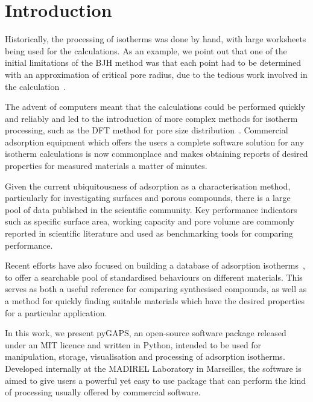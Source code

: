 
\section{Introduction}

Historically, the processing of isotherms was done by hand, with large 
worksheets being used for the calculations. As an example, we point out that one of 
the initial limitations of the BJH method was 
that each point had to 
be determined with an approximation of critical pore radius, due to the 
tedious work involved in the calculation~\cite{barrettDeterminationPoreVolume1951}.

The advent of computers meant that the calculations could be performed
quickly and reliably and led to the introduction of more complex
methods for isotherm processing, such as the DFT method for pore size
distribution~\cite{seatonNewAnalysisMethod1989, tarazonaPhaseEquilibriaFluid1987}. 
Commercial adsorption equipment which offers the users
a complete software solution for any isotherm calculations is now
commonplace and makes obtaining reports of desired properties
for measured materials a matter of minutes.

Given the current ubiquitousness of adsorption as a characterisation method,
particularly for investigating surfaces and porous compounds,
there is a large pool of data published in the scientific community.
Key performance indicators such as specific surface area, working 
capacity and pore volume are commonly reported in scientific literature
and used as benchmarking tools for comparing performance.

Recent efforts have also focused on building a database of adsorption 
isotherms~\cite{sideriusNISTARPAEDatabase2015}, to offer a searchable pool of 
standardised behaviours on different materials. This serves as both a useful reference for
comparing synthesised compounds, as well as a method for quickly 
finding suitable materials which have the desired properties
for a particular application.

In this work, we present pyGAPS, an open-source software package released
under an MIT licence and written in Python, intended to be used for 
manipulation, storage, visualisation and processing of adsorption isotherms.
Developed internally at the MADIREL Laboratory in
Marseilles, the software is aimed to give users a powerful yet easy to
use package that can perform the kind of processing usually offered by
commercial software.
